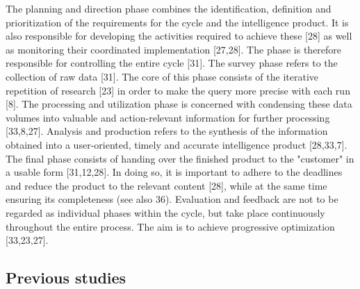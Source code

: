 \documentclass[10pt]{article}
\begin{document}
\newline
\newline
The planning and direction phase combines the identification, definition and prioritization of the requirements for the cycle and the intelligence product. It is also responsible for developing the activities required to achieve these [28] as well as monitoring their coordinated implementation [27,28]. The phase is therefore responsible for controlling the entire cycle [31]. The survey phase refers to the collection of raw data [31]. The core of this phase consists of the iterative repetition of research [23] in order to make the query more precise with each run [8]. The processing and utilization phase is concerned with condensing these data volumes into valuable and action-relevant information for further processing [33,8,27]. Analysis and production refers to the synthesis of the information obtained into a user-oriented, timely and accurate intelligence product [28,33,7]. The final phase consists of handing over the finished product to the "customer" in a usable form [31,12,28]. In doing so, it is important to adhere to the deadlines and reduce the product to the relevant content [28], while at the same time ensuring its completeness (see also 36). Evaluation and feedback are not to be regarded as individual phases within the cycle, but take place continuously throughout the entire process. The aim is to achieve progressive optimization [33,23,27].

\subsection{Previous studies}
\end{document}
